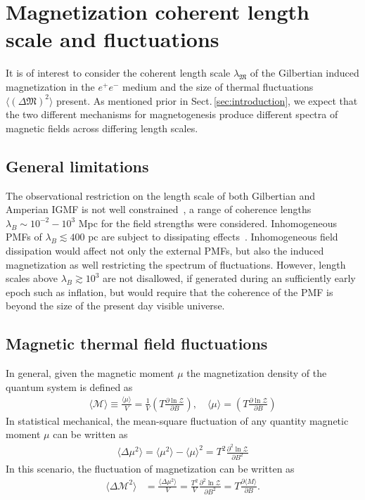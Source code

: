\documentclass[aps,prd,floatfix,reprint]{revtex4-2}
\newcommand{\rsec}[1]{Sect.\,{\ref{#1}}}
\newcommand*{\xblue}{\color{blue}}
\begin{document}
{\xblue
\section{Magnetization coherent length scale and fluctuations}
\label{sec:lengthscale}
\noindent It is of interest to consider the coherent length scale $\lambda_\mathfrak{M}$ of the Gilbertian induced magnetization in the $e^{+}e^{-}$ medium and the size of thermal fluctuations $\langle(\Delta\mathfrak{M})^{2}\rangle$ present. As mentioned prior in \rsec{sec:introduction}, we expect that the two different mechanisms for magnetogenesis produce different spectra of magnetic fields across differing length scales. 

\subsection{General limitations}
The observational restriction on the  length scale of both Gilbertian and Amperian IGMF is  not well constrained~\cite{Giovannini:2022rrl,Durrer:2013pga,AlvesBatista:2021sln}, a range of coherence lengths  $\lambda_{B}\sim10^{-2}-10^{3}$ Mpc for the field strengths were considered. Inhomogeneous PMFs of $\lambda_{B}\lesssim400$ pc are subject to dissipating effects~\cite{Jedamzik:1999bm}. Inhomogeneous field dissipation would affect not only the external PMFs, but also the induced magnetization as well restricting the spectrum of fluctuations. However, length scales above $\lambda_{B}\gtrsim10^{3}$ are not disallowed, if generated during an sufficiently early epoch such as inflation, but would require that the coherence of the PMF is beyond the size of the present day visible universe.

\subsection{Magnetic thermal field fluctuations}
In general, given the magnetic moment $\mu$ the magnetization density of the quantum system is defined as
\begin{align}
\langle \mathcal M\rangle\equiv\frac{\langle \mu\rangle}{V}=\frac{1}{V}\left(T\frac{\partial \ln\mathcal Z}{\partial B}\right),\quad \langle\mu\rangle=\left(T\frac{\partial \ln\mathcal Z}{\partial B}\right)
\end{align}
In statistical mechanical, the mean-square fluctuation of any quantity magnetic moment $\mu$ can be written as
\begin{align}
\langle\Delta \mu^2\rangle=\langle \mu^2\rangle-\langle \mu\rangle^2=T^2\frac{\partial^2 \ln\mathcal Z }{\partial B^2}
\end{align}
In this scenario, the fluctuation of magnetization can be written as
\begin{align}
{\langle\Delta \mathcal M^2\rangle}&=\frac{\langle\Delta \mu^2\rangle}{V}=\frac{T^2}{V}\frac{\partial^2 \ln\mathcal Z }{\partial B^2}=T\frac{\partial\langle M\rangle}{\partial B}.
\end{align}

}
\end{document}
